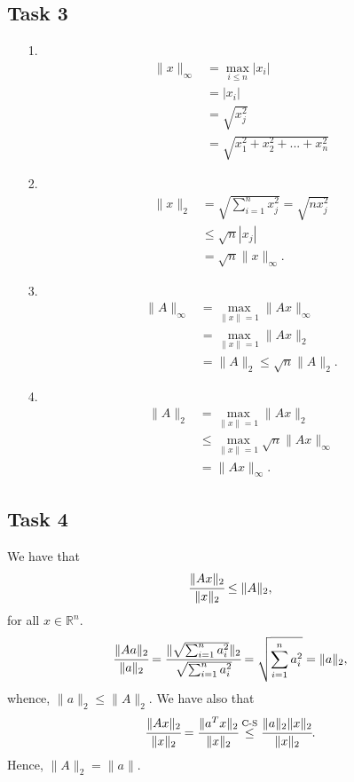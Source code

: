 \documentclass[a4paper,12pt]{article}
\begin{document}
\subsection*{Task 3}
\begin{itemize}
	\item [1.]
	\begin{align*}
	\|x\|_\infty&=\underset{i\le n}{\max} |x_i|\\
	&=|x_i|\\
	&=\sqrt{x_j^2}\\
	&=\sqrt{x_1^2 + x_2^2+...+x_n^2}
	\end{align*}
	
	\item [2.]
	\begin{align*}
	\|x\|_2&=\sqrt{\sum_{i=1}^n x_j^2}=\sqrt{n x_j^2}\\
	&\le\sqrt{n}|x_j|\\
	&=\sqrt{n}\|x\|_\infty.
	\end{align*}
	\item [3.]
	\begin{align*}
	\|A\|_\infty &=\underset{\|x\|=1}{\max} \|Ax\|_\infty \\
	&=\underset{\|x\|=1}{\max} \|Ax\|_2\\
	&=\|A\|_2\le \sqrt{n}\|A\|_2.
	\end{align*}
	
	\item [4.]
	\begin{align*}
	\|A\|_2&=\underset{\|x\|=1}{\max}\|Ax\|_2 \\
	&\le \underset{\|x\|=1}{\max} \sqrt{n}\|Ax\|_\infty \\
	&= \|Ax\|_\infty.
	\end{align*}
\end{itemize}



\subsection*{Task 4}
We have that 
\begin{equation*}
\cfrac{\|Ax\|_2}{\|x\|_2}\le \|A\|_2,
\end{equation*}
for all $x\in \mathbb{R}^n$.
\begin{equation*}
\cfrac{\|Aa\|_2}{\|a\|_2}=\cfrac{\|\sqrt{\sum_{i=1}^{n} a_i^2}\|_2}{\sqrt{\sum_{i=1}^{n} a_i^2}}=\sqrt{\sum_{i=1}^{n} a_i^2}= \|a\|_2,
\end{equation*}
whence, $\|a\|_2\le \|A\|_2$.
We have also that
\begin{equation*}
\cfrac{\|Ax\|_2}{\|x\|_2}=\cfrac{\|a^Tx\|_2}{\|x\|_2}\overset{\text{C-S}}{\le} \cfrac{\|a\|_2 \|x\|_2}{\|x\|_2}.
\end{equation*}
Hence, $\|A\|_2= \|a\|$.
\end{document}
